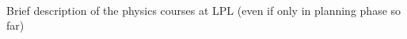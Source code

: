 \documentclass{report}
\begin{document}
\clearpage
\begin{figure}
    \centering
\end{figure}
\clearpage

 \\

Brief description of the physics courses at LPL (even if only in planning phase so far)

\clearpage
\begin{figure}
    \centering
\end{figure}
\clearpage
\end{document}

